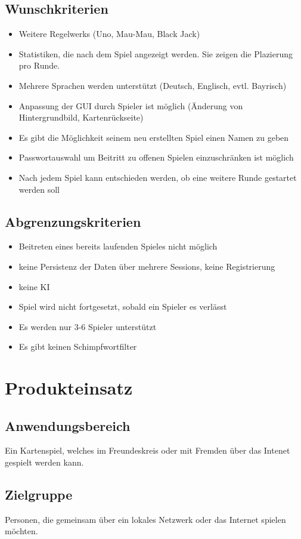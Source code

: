 \documentclass{article}
\begin{document}
\subsection{Wunschkriterien}
\begin{itemize}
	\item Weitere \glspl{Regelwerk} (Uno, Mau-Mau, Black Jack)
	\item Statistiken, die nach dem Spiel angezeigt werden. Sie zeigen die Plazierung pro Runde.
	\item Mehrere Sprachen werden unterstützt (Deutsch, Englisch, evtl. Bayrisch)
	\item Anpassung der GUI durch Spieler ist möglich (Änderung von Hintergrundbild, Kartenrückseite)
	\item Es gibt die Möglichkeit seinem neu erstellten Spiel einen Namen zu geben
	\item Passwortauswahl um Beitritt zu offenen Spielen einzuschränken ist möglich
	\item Nach jedem Spiel kann entschieden werden, ob eine weitere Runde gestartet werden soll
\end{itemize}

\subsection{Abgrenzungskriterien}
\begin{itemize}
	\item Beitreten eines bereits laufenden Spieles nicht möglich
	\item keine Persistenz der Daten über mehrere Sessions, keine Registrierung
	\item keine KI
	\item Spiel wird nicht fortgesetzt, sobald ein Spieler es verlässt
	\item Es werden nur 3-6 Spieler unterstützt
	\item Es gibt keinen Schimpfwortfilter
\end{itemize}

\section{Produkteinsatz}
\subsection{Anwendungsbereich}
Ein Kartenspiel, welches im Freundeskreis oder mit Fremden über das Intenet gespielt werden kann.
\subsection{Zielgruppe}
Personen, die gemeinsam über ein lokales Netzwerk oder das Internet spielen möchten. 
\end{document}
